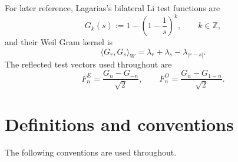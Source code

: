 \documentclass[preprint,12pt]{elsarticle}
\numberwithin{equation}{section}
\theoremstyle{plain}
\theoremstyle{definition}
\theoremstyle{remark}
\begin{document}
For later reference, Lagarias's bilateral Li test functions are
\begin{equation}
G_k(s):=1-\left(1-\frac1s\right)^k,
\qquad k\in\mathbb Z,
\label{eq:intro_Lagarias_test}
\end{equation}
and their Weil Gram kernel is
\begin{equation}
\langle G_r,G_s\rangle_W
=\lambda_r+\lambda_s-\lambda_{|r-s|}.
\label{eq:intro_Lagarias_Gram}
\end{equation}
The reflected test vectors used throughout are
\begin{equation}
F_n^E=\frac{G_n-G_{-n}}{\sqrt2},
\qquad
F_n^O=\frac{G_n-G_{1-n}}{\sqrt2}.
\label{eq:intro_reflected_tests}
\end{equation}

\section{Definitions and conventions}
\label{sec:notation_definitions}

The following conventions are used throughout.
\end{document}
